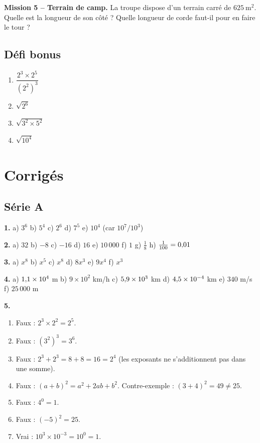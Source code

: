 \documentclass[../main.tex]{subfiles}
\begin{document}
\textbf{Mission 5 -- Terrain de camp.}
La troupe dispose d'un terrain carré de $625\ \text{m}^2$. Quelle est la longueur de son côté ? Quelle longueur de corde faut-il pour en faire le tour ?

\subsection{Défi bonus}

\begin{enumerate}[label=\alph*)]
  \item $\dfrac{2^3 \times 2^5}{(2^2)^3}$ \qquad
  \item $\sqrt{2^6}$ \qquad
  \item $\sqrt{3^2 \times 5^2}$ \qquad
  \item $\sqrt{10^4}$
\end{enumerate}

\newpage
\section{Corrigés}

\subsection*{Série A}

\textbf{1.} a) $3^6$ \quad b) $5^4$ \quad c) $2^6$ \quad d) $7^5$ \quad e) $10^4$ (car $10^7 / 10^3$)

\textbf{2.} a) $32$ \quad b) $-8$ \quad c) $-16$ \quad d) $16$ \quad e) $10\,000$ \quad f) $1$ \quad g) $\frac{1}{8}$ \quad h) $\frac{1}{100} = 0{,} 01$

\textbf{3.} a) $x^8$ \quad b) $x^5$ \quad c) $x^8$ \quad d) $8x^3$ \quad e) $9x^4$ \quad f) $x^3$

\textbf{4.} a) $1{,} 1 \times 10^4$ m \quad b) $9 \times 10^2$ km/h \quad c) $5{,} 9 \times 10^3$ km \quad d) $4{,} 5 \times 10^{-4}$ km \quad e) $340$ m/s \quad f) $25\,000$ m

\textbf{5.}
\begin{enumerate}[label=\alph*)]
  \item Faux : $2^3 \times 2^2 = 2^5$.
  \item Faux : $(3^2)^3 = 3^6$.
  \item Faux : $2^3 + 2^3 = 8 + 8 = 16 = 2^4$ (les exposants ne s'additionnent pas dans une somme).
  \item Faux : $(a+b)^2 = a^2 + 2ab + b^2$. Contre-exemple : $(3+4)^2 = 49 \neq 25$.
  \item Faux : $4^0 = 1$.
  \item Faux : $(-5)^2 = 25$.
  \item Vrai : $10^3 \times 10^{-3} = 10^0 = 1$.
\end{enumerate}
\end{document}
